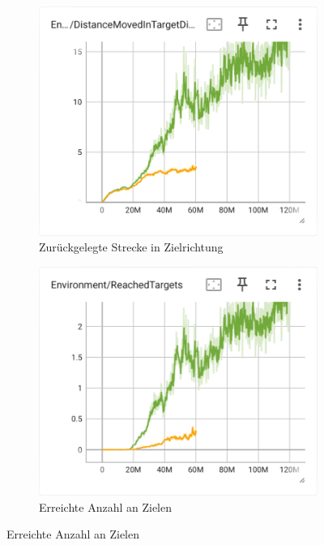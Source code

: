 \begin{figure}[H]
  \centering  
    \begin{subfigure}{.49\textwidth}
      \centering  
      \includegraphics[width=\textwidth]{img/117_119_move_target_dir}
      \caption{Zurückgelegte Strecke in Zielrichtung}
      \label{fig:117_119_move_target_dir}
    \end{subfigure}
    \begin{subfigure}{.49\textwidth}
      \centering  
      \includegraphics[width=\textwidth]{img/117_119_reach_target}
      \caption{Erreichte Anzahl an Zielen}

\end{subfigure}
\end{figure}

